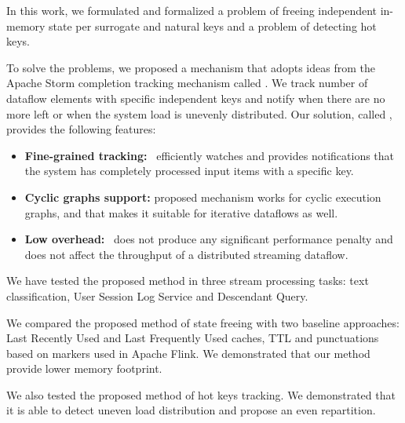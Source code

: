 \label {fs-acker-conclusion}

In this work, we formulated and formalized a problem of freeing independent in-memory state per surrogate and natural keys and a problem of detecting hot keys.

To solve the problems, we proposed a mechanism that adopts ideas from the Apache Storm completion tracking mechanism called \acker. We track number of dataflow elements with specific independent keys and notify when there are no more left or when the system load is unevenly distributed. Our solution, called \tracker, provides the following features:
\begin{itemize}
    \item {\bf Fine-grained tracking:} \tracker\ efficiently watches and provides notifications that the system has completely processed input items with a specific key.
    \item {\bf Cyclic graphs support:} proposed mechanism works for cyclic execution graphs, and that makes it suitable for iterative dataflows as well. 
    \item {\bf Low overhead:} \tracker\ does not produce any significant performance penalty and does not affect the throughput of a distributed streaming dataflow.
\end{itemize}

We have tested the proposed method in three stream processing tasks: text classification, User Session Log Service and Descendant Query.

We compared the proposed method of state freeing with two baseline approaches: Last Recently Used and Last Frequently Used caches, TTL and punctuations based on markers used in Apache Flink. We demonstrated that our method provide lower memory footprint.

We also tested the proposed method of hot keys tracking. We demonstrated that it is able to detect uneven load distribution and propose an even repartition.
